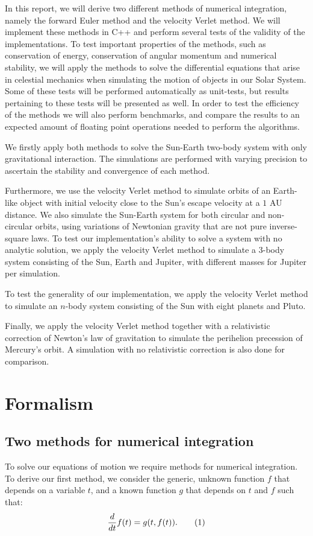 \documentclass[reprint,english,notitlepage]{revtex4-1}  %
\newcommand\numberthis{\addtocounter{equation}{1}\tag{\theequation}}
\begin{document}
In this report, we will derive two different methods of numerical integration, namely the forward Euler method and the velocity Verlet method. We will implement these methods in C++ and perform several tests of the validity of the implementations. To test important properties of the methods, such as conservation of energy, conservation of angular momentum and numerical stability, we will apply the methods to solve the differential equations that arise in celestial mechanics when simulating the motion of objects in our Solar System. Some of these tests will be performed automatically as unit-tests, but results pertaining to these tests will be presented as well. In order to test the efficiency of the methods we will also perform benchmarks, and compare the results to an expected amount of floating point operations needed to perform the algorithms.   

We firstly apply both methods to solve the Sun-Earth two-body system with only gravitational interaction. The simulations are performed with varying precision to ascertain the stability and convergence of each method.

Furthermore, we use the velocity Verlet method to simulate orbits of an Earth-like object with initial velocity close to the Sun’s escape velocity at a \(1\) AU distance. We also simulate the Sun-Earth system for both circular and non-circular orbits, using variations of Newtonian gravity that are not pure inverse-square laws. To test our implementation's ability to solve a system with no analytic solution, we apply the velocity Verlet method to simulate a \(3\)-body system consisting of the Sun, Earth and Jupiter, with different masses for Jupiter per simulation.

To test the generality of our implementation, we apply the velocity Verlet method to simulate an \(n\)-body system consisting of the Sun with eight planets and Pluto.

Finally, we apply the velocity Verlet method together with a relativistic correction of Newton's law of gravitation to simulate the perihelion precession of Mercury's orbit. A simulation with no relativistic correction is also done for comparison.

\section{Formalism} \label{sec:II}

\subsection{Two methods for numerical integration} \label{sec:II:a}
To solve our equations of motion we require methods for numerical integration. To derive our first method, we consider the generic, unknown function \(f\) that depends on a variable \(t\), and a known function $g$ that depends on $t$ and $f$ such that:
\begin{align*}
	\frac{d}{dt}f(t) = g(t, f(t)). \numberthis \label{eq:fofg}
\end{align*}
\end{document}
